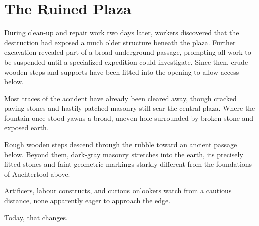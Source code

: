 \section*{The Ruined Plaza}

{\entryfont During clean-up and repair work two days later, workers discovered that the destruction had exposed a much older structure beneath the plaza. Further excavation revealed part of a broad underground passage, prompting all work to be suspended until a specialized expedition could investigate. Since then, crude wooden steps and supports have been fitted into the opening to allow access below.}
\begin{DndReadAloud}
	Most traces of the accident have already been cleared away, though cracked paving stones and hastily patched masonry still scar the central plaza. Where the fountain once stood yawns a broad, uneven hole surrounded by broken stone and exposed earth.

	Rough wooden steps descend through the rubble toward an ancient passage below. Beyond them, dark-gray masonry stretches into the earth, its precisely fitted stones and faint geometric markings starkly different from the foundations of Auchtertool above.

	Artificers, labour constructs, and curious onlookers watch from a cautious distance, none apparently eager to approach the edge.

	Today, that changes.
\end{DndReadAloud}